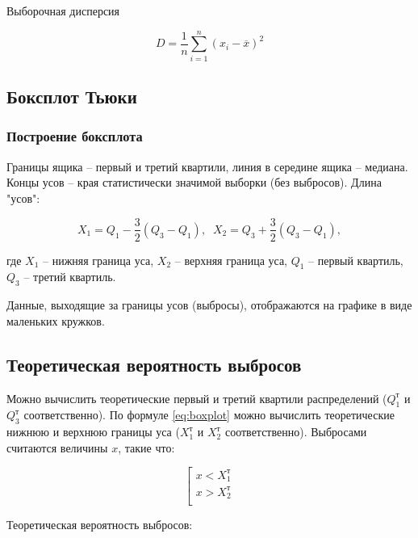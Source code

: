Выборочная дисперсия

\begin{equation}
	D = \frac{1}{n}\sum\limits_{i=1}^{n} (x_i - \overline{x})^2
\end{equation}

\subsection{Боксплот Тьюки}

\subsubsection{Построение боксплота}

Границы ящика -- первый и третий квартили, линия в середине ящика -- медиана. Концы усов -- края статистически значимой выборки (без выбросов). Длина "усов":

\begin{equation} \label{eq:boxplot}
	X_1 = Q_1 - \dfrac{3}{2}(Q_3 - Q_1), \;\; X_2 = Q_3 + \dfrac{3}{2}(Q_3 - Q_1),
\end{equation}

где $X_1$ -- нижняя граница уса, $X_2$ -- верхняя граница уса, $Q_1$ -- первый квартиль, $Q_3$ -- третий квартиль.

Данные, выходящие за границы усов (выбросы), отображаются на графике в виде маленьких кружков. \cite{s:boxplot}

\subsection{Теоретическая вероятность выбросов}

Можно вычислить теоретические первый и третий квартили распределений ($Q_1^\text{т}$ и $Q_3^\text{т}$ соответственно). По формуле \eqref{eq:boxplot} можно вычислить теоретические нижнюю и верхнюю границы уса ($X_1^\text{т}$ и $X_2^\text{т}$ соответственно). Выбросами считаются величины $x$, такие что:

\begin{equation}
	\left[
	\begin{gathered} 
		x < X_1^\text{т}\\ 
		x > X_2^\text{т}\\ 
	\end{gathered} 
	\right.
\end{equation}

Теоретическая вероятность выбросов:


